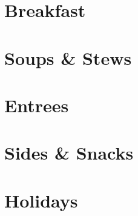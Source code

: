 \documentclass{article}
\begin{document}
\tableofcontents

% 
%
% 

\section{Breakfast}
% 




\section{Soups \& Stews}





\section{Entrees}



\section{Sides \& Snacks}




\section{Holidays}






\end{document}
